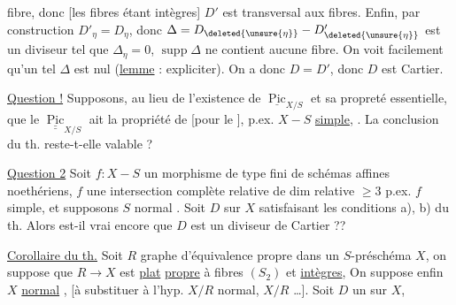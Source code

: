 fibre, donc [les fibres étant intègres] $D'$ est transversal aux fibres. Enfin,  par construction $D'_\eta=D_\eta$, donc $\Delta=D_{\deleted{\unsure{\eta}}}-D'_{\deleted{\unsure{\eta}}}$ est un diviseur tel que $\Delta_\eta=0$, $\operatorname{supp}\Delta$ ne contient aucune fibre. On voit facilement qu'un tel $\Delta$ est nul (\uline{lemme} : expliciter). On a donc $D=D'$, donc $D$ est Cartier.


\uline{Question !} Supposons, au lieu de l'existence de $\underline{\operatorname{Pic}}_{X/S}$ et sa propreté essentielle, que le  $\underline{\underline{\operatorname{Pic}}}_{X/S}$ ait la propriété de   [pour le ], p.ex. $X\mathbin{-}S$ \uline{simple}, .  La conclusion du th. reste-t-elle valable ?

\uline{Question 2} Soit $f:X\mathbin{-}S$ un morphisme  de type fini de schémas affines noethériens, $f$  une intersection complète relative de dim relative $\geq3$  p.ex. $f$ simple, et supposons $S$ normal . Soit $D$ sur $X$ satisfaisant les conditions a), b) du th. Alors est-il vrai encore que $D$ est un diviseur de Cartier ??


\uline{Corollaire du th.} Soit $R$ graphe d'équivalence propre dans un $S$-préschéma $X$, on suppose que $R\longrightarrow X$ est \uline{plat} \uline{propre} à fibres  $(S_2)$ et \uline{intègres}, On suppose enfin $X$ \uline{normal} ,  [à substituer à l'hyp. $X/R$ normal, $X/R$ \ldots]. Soit $D$ un   sur $X$,


